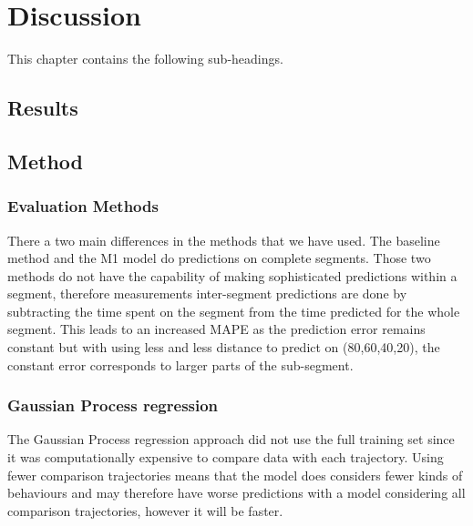 
\chapter{Discussion}
\label{cha:discussion}

This chapter contains the following sub-headings.

\section{Results}
\label{sec:discussion-results}


\section{Method}
\label{sec:discussion-method}
\subsection{Evaluation Methods}
There a two main differences in the methods that we have used. The baseline method and the M1 model do predictions on complete segments. Those two methods do not have the capability of making sophisticated predictions within a segment, therefore measurements inter-segment predictions are done by subtracting the time spent on the segment from the time predicted for the whole segment. This leads to an increased MAPE as the prediction error remains constant but with using less and less distance to predict on (80,60,40,20), the constant error corresponds to larger parts of the sub-segment.

\subsection{Gaussian Process regression}
The Gaussian Process regression approach did not use the full training set since it was computationally expensive to compare data with each trajectory. Using fewer comparison trajectories means that the model does considers fewer kinds of behaviours and may therefore have worse predictions with a model considering all comparison trajectories, however it will be faster.

